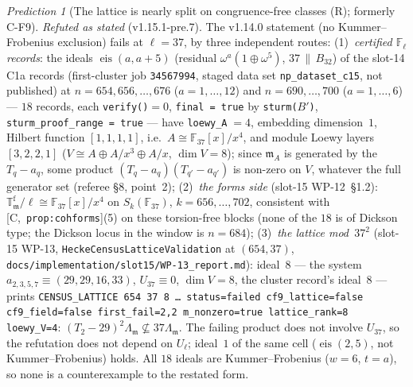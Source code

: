\documentclass[11pt]{article}
\theoremstyle{remark}
\newtheorem{prediction}[theorem]{Prediction}
\newcommand{\F}{\mathbb{F}}
\newcommand{\Fl}{\F_\ell}
\newcommand{\T}{\mathbb{T}}
\newcommand{\m}{\mathfrak{m}}
\newcommand{\HA}[1]{[C,~\texttt{#1}]}      %
\begin{document}
\begin{prediction}[The lattice is nearly split on congruence-free classes (R); formerly C-F9]
\emph{Refuted as stated} (v1.15.1-pre.7). The v1.14.0 statement (no Kummer--Frobenius exclusion) fails at $\ell=37$, by three
independent routes:
(1)~\emph{certified $\Fl$ records}: the ideals $\operatorname{eis}(a,a+5)$ (residual $\omega^a(1\oplus\omega^5)$, $37\,\|\,B_{32}$)
of the slot-14 C1a records (first-cluster job \texttt{34567994}, staged data set \texttt{np\_dataset\_c15}, not published) at
$n=654,656,\dots,676$ ($a=1,\dots,12$) and $n=690,\dots,700$ ($a=1,\dots,6$) --- $18$ records, each \texttt{verify()}$=0$,
\texttt{final = true} by \texttt{sturm($B'$)}, \texttt{sturm\_proof\_range = true} --- have \texttt{loewy\_A}$\;=4$, embedding
dimension~$1$, Hilbert function $[1,1,1,1]$, i.e.\ $A\cong\F_{37}[x]/x^4$, and module Loewy layers $[3,2,2,1]$
($V\cong A\oplus A/x^3\oplus A/x$, $\dim V=8$); since $\m_A$ is generated by the $T_q-a_q$, some product
$(T_q-a_q)(T_{q'}-a_{q'})$ is non-zero on $V$, whatever the full generator set (referee \S8, point~2);
(2)~\emph{the forms side} (slot-15 WP-12~\S1.2): $\T^{\mathrm f}_\m/\ell\cong\F_{37}[x]/x^4$ on $S_k(\F_{37})$, $k=656,\dots,702$,
consistent with \HA{prop:cohforms}(5) on these torsion-free blocks (none of the $18$ is of Dickson type; the Dickson locus in the
window is $n=684$);
(3)~\emph{the lattice mod~$37^2$} (slot-15 WP-13, \texttt{HeckeCensusLatticeValidation} at $(654,37)$,
\texttt{docs/implementation/slot15/WP-13\_report.md}): ideal~$8$ --- the system $a_{2,3,5,7}\equiv(29,29,16,33)$, $U_{37}\equiv0$,
$\dim V=8$, the cluster record's ideal~$8$ --- prints \texttt{CENSUS\_LATTICE 654 37 8 \dots{} status=failed cf9\_lattice=false
cf9\_field=false first\_fail=2,2 m\_nonzero=true lattice\_rank=8 loewy\_V=4}: $(T_2-29)^2\Lambda_\m\not\subseteq37\Lambda_\m$.
The failing product does not involve $U_{37}$, so the refutation does not depend on $U_\ell$; ideal~$1$ of the same cell
($\operatorname{eis}(2,5)$, not Kummer--Frobenius) holds. All $18$ ideals are Kummer--Frobenius ($w=6$, $t=a$), so none is a
counterexample to the restated form.


\end{prediction}
\end{document}
